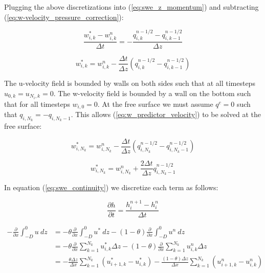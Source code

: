 \documentclass[12pt]{article}
\begin{document}
Plugging the above discretizations into (\ref{eq:swe_z_momentum}) and subtracting (\ref{eq:w-velocity_pressure_correction}):

\begin{equation*}
\frac{w_{i,k}^* - w_{i,k}^n}{\Delta t} = - \frac{q_{i,k}^{n-1/2} - q_{i,k-1}^{n-1/2}}{\Delta z}
\end{equation*}

\begin{equation} \label{eq:w_predictor_velocity}
w_{i,k}^* = w_{i,k}^n - \frac{\Delta t}{\Delta z} (q_{i,k}^{n-1/2} - q_{i,k-1}^{n-1/2})
\end{equation}

The u-velocity field is bounded by walls on both sides such that at all timesteps $u_{0,k} = u_{N_i,k} = 0$. The w-velocity field is bounded by a wall on the bottom such that for all timesteps $w_{i,0} = 0$. At the free surface we must assume $q^c = 0$ such that $q_{i,N_k} = -q_{i,N_k-1}$. This allows (\ref{eq:w_predictor_velocity}) to be solved at the free surface:

\begin{equation*}
w_{i,N_k}^* = w_{i,N_k}^n - \frac{\Delta t}{\Delta z} (q_{i,N_k}^{n-1/2} - q_{i,N_k-1}^{n-1/2})
\end{equation*}

\begin{equation} \label{eq:w_str_free_surface}
w_{i,N_k}^* = w_{i,N_k}^n + \frac{2\Delta t}{\Delta z} q_{i,N_k-1}^{n-1/2}
\end{equation}

In equation (\ref{eq:swe_continuity}) we discretize each term as follows:

\begin{equation*}
\frac{\partial h}{\partial t} = \frac{h_{i}^{n+1} - h_i^n}{\Delta t}
\end{equation*}

\begin{align*}
-\frac{\partial}{\partial x} \int_{-D}^{0} u~ dz &= - \theta  \frac{\partial}{\partial x} \int_{-D}^{0} u^*~ dz - (1-\theta) \frac{\partial}{\partial x} \int_{-D}^{0} u^n~ dz
\\
 &= - \theta  \frac{\partial}{\partial x} \sum_{k=1}^{N_k} u_{i,k}^* \Delta z - (1-\theta) \frac{\partial}{\partial x} \sum_{k=1}^{N_k} u_{i,k}^n \Delta z
\\
 &= - \frac{\theta \Delta z}{\Delta x} \sum_{k=1}^{N_k} (u_{i+1,k}^* - u_{i,k}^*) -  \frac{(1-\theta) \Delta z}{\Delta x} \sum_{k=1}^{N_k} (u_{i+1,k}^n - u_{i,k}^n)
\end{align*}
\end{document}
